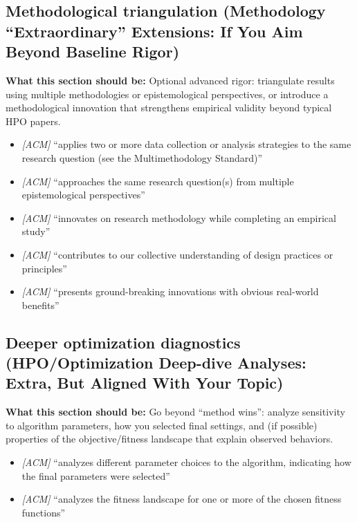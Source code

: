 \documentclass[11pt]{article}
\begin{document}
\subsection{Methodological triangulation (Methodology ``Extraordinary'' Extensions: If You Aim Beyond Baseline Rigor)}
\noindent\textbf{What this section should be:}
Optional advanced rigor: triangulate results using multiple methodologies or epistemological perspectives, or introduce a methodological innovation that strengthens empirical validity beyond typical HPO papers.
\begin{itemize}
  \item \textit{[ACM]} ``applies two or more data collection or analysis strategies to the same research question (see the Multimethodology Standard)''
  \item \textit{[ACM]} ``approaches the same research question(s) from multiple epistemological perspectives''
  \item \textit{[ACM]} ``innovates on research methodology while completing an empirical study''
  \item \textit{[ACM]} ``contributes to our collective understanding of design practices or principles''
  \item \textit{[ACM]} ``presents ground-breaking innovations with obvious real-world benefits''
\end{itemize}

\subsection{Deeper optimization diagnostics (HPO/Optimization Deep-dive Analyses: Extra, But Aligned With Your Topic)}
\noindent\textbf{What this section should be:}
Go beyond ``method wins'': analyze sensitivity to algorithm parameters, how you selected final settings, and (if possible) properties of the objective/fitness landscape that explain observed behaviors.
\begin{itemize}
  \item \textit{[ACM]} ``analyzes different parameter choices to the algorithm, indicating how the final parameters were selected''
  \item \textit{[ACM]} ``analyzes the fitness landscape for one or more of the chosen fitness functions''
\end{itemize}
\end{document}
